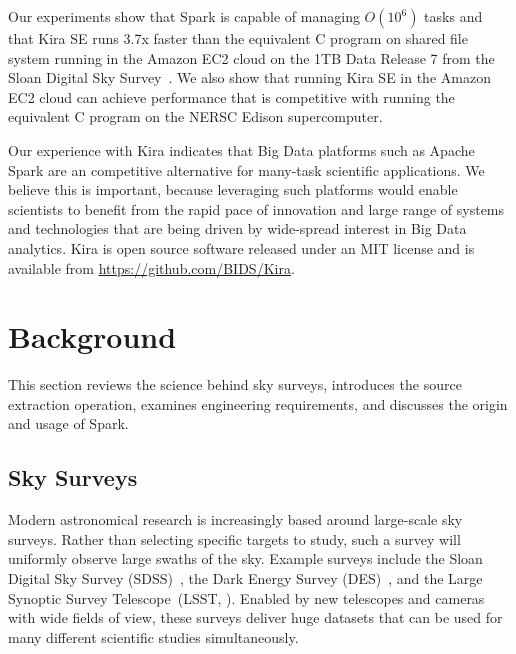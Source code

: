 \documentclass[conference]{IEEEtran}
\newcommand{\zhaonote}[1]{{\textcolor{cyan}    { ***Zhao:      #1 }}}
\newcommand{\franknote}[1]{{\textcolor{green}    { ***Frank:      #1 }}}
\newcommand{\zhaonote}[1]{}
\newcommand{\franknote}[1]{}
\begin{document}
Our experiments show that Spark is capable of managing $O(10^6)$ tasks and that Kira SE runs 3.7x faster than the equivalent C program on shared file system running in the Amazon EC2 cloud on the 1TB Data Release 7 from the Sloan Digital Sky Survey~\cite{york00}. We also show that running Kira SE in the Amazon EC2 cloud can achieve performance that is competitive with running the equivalent C program on the NERSC Edison supercomputer.

Our experience with Kira indicates that Big Data platforms such as Apache Spark are an competitive alternative for many-task scientific applications.   
We believe this is important, because leveraging such platforms would enable scientists to benefit from the rapid pace of innovation and large range of systems and technologies that are being driven by wide-spread interest in Big Data analytics.
Kira is open source software released under an MIT license and is available from \linebreak \url{https://github.com/BIDS/Kira}.



\section{Background}
\label{sec:Background}

This section reviews the science behind sky surveys, introduces the source extraction operation, examines engineering requirements, and discusses the origin and usage of Spark.

\subsection{Sky Surveys}

Modern astronomical research is increasingly based around large-scale sky surveys.
Rather than selecting specific targets to study, such a survey will uniformly observe large
swaths of the sky. Example surveys include the Sloan Digital Sky Survey (SDSS)~\cite{york00},
the Dark Energy Survey (DES)~\cite{dark05}, and the Large Synoptic Survey Telescope~(LSST,
\cite{ivezic08}). Enabled by new telescopes and cameras with wide fields of view, these
surveys deliver huge datasets that can be used for many different scientific studies
simultaneously.
\end{document}
